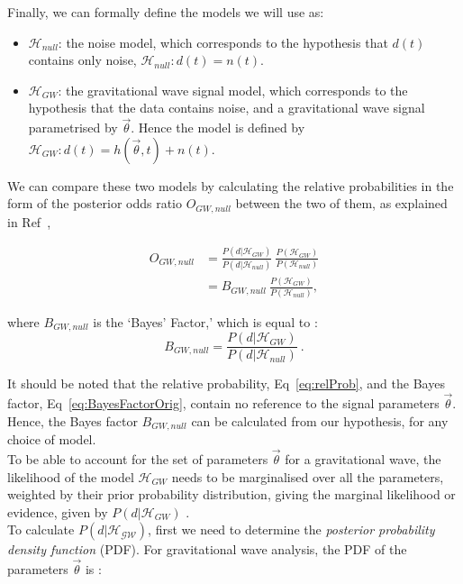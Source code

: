 \documentclass{article}
\begin{document}
 
 
 Finally, we can formally define the models we will use as:
\begin{itemize}
	\item $\mathcal{H}_{null}$: the noise model, which corresponds to the hypothesis that $d(t)$ contains only noise,
	$\mathcal{H}_{null}: d(t) = n(t)$.
	\item $\mathcal{H}_{GW}$: the gravitational wave signal model, which corresponds to the hypothesis that the data contains noise, and a gravitational wave signal parametrised by $\vec{\theta}$. Hence the model is defined by $\mathcal{H}_{GW}: d(t) = h(\vec{\theta},t) + n(t)$.
\end{itemize}
 
 
We can compare these two models by calculating the relative probabilities in the form of the posterior odds ratio $O_{GW, null}$ between the two of them, as explained in Ref~\cite{BaeStats}, 
  
  \begin{align} \label{eq:relProb}
  O_{GW, null} &= \frac{P(d|  \mathcal{H}_{GW})}{P(d|  \mathcal{H}_{null})} \  \frac{P(\mathcal{H}_{GW}) }{P(\mathcal{H}_{null})}  \nonumber\\
  &= B_{GW, null} \ \frac{P( \mathcal{H}_{GW}) }{P( \mathcal{H}_{null})},
  \end{align} 
  
   where $B_{GW, null}$ is the `Bayes' Factor,' which is equal to :\\
  \begin{equation} \label{eq:BayesFactorOrig}
  B_{GW, null} = \frac{P(d|  \mathcal{H}_{GW})}{P(d|  \mathcal{H}_{null})} \ .
  \end{equation}
 
It should be noted that the relative probability, Eq~\ref{eq:relProb}, and the Bayes factor, Eq~\ref{eq:BayesFactorOrig}, contain no reference to the signal parameters $\vec{\theta}$. Hence, the Bayes factor $B_{GW, null}$ can be calculated from our hypothesis, for any choice of model.\\

 To be able to account for the set of parameters $\vec{\theta}$ for a gravitational wave, the likelihood of the model $\mathcal{H}_{GW}$ needs to be marginalised over all the parameters, weighted by their prior probability distribution, giving the marginal likelihood or evidence, given by $P(d|\mathcal{H}_{GW})$  \cite{BaeStats}.\\
 

To calculate $P(d|\mathcal{H_{GW}})$, first we need to determine the \textit{posterior probability density function} (PDF). For gravitational wave analysis, the PDF of the parameters $\vec{\theta}$ is \cite{RSmith}:
\end{document}
